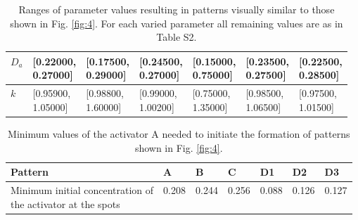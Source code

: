 \begin{table}[hb]
\begin{tabular}{|l|l|l|l|l|l|l|}
$D_{a}$				& \thead{{[}0.22000, \\ 0.27000{]}} & \thead{{[}0.17500, \\ 0.29000{]}} & \thead{{[}0.24500, \\ 0.27000{]}} & \thead{{[}0.15000, \\ 0.75000{]}} & \thead{{[}0.23500, \\ 0.27500{]}} & \thead{{[}0.22500, \\ 0.28500{]}} \\ \hline
$k$					& \thead{{[}0.95900, \\ 1.05000{]}} & \thead{{[}0.98800, \\ 1.60000{]}} & \thead{{[}0.99000, \\ 1.00200{]}} & \thead{{[}0.75000, \\ 1.35000{]}} & \thead{{[}0.98500, \\ 1.06500{]}} & \thead{{[}0.97500, \\ 1.01500{]}} \\ \hline
\end{tabular}
\caption{Ranges of parameter values resulting in patterns visually similar to those shown in Fig. \ref{fig:4}. For each varied parameter all remaining values are as in Table S2.}
\label{tab:S3}
\end{table}

\begin{table}[hb]
\centering
\begin{tabular}{|l|l|l|l|l|l|l|}
\hline
\textbf{Pattern}                                            & \textbf{A} & \textbf{B} & \textbf{C} & \textbf{D1} & \textbf{D2} & \textbf{D3} \\ \hline
\thead{Minimum initial concentration of \\ the activator at the spots} & 0.208      & 0.244      & 0.256      & 0.088       & 0.126       & 0.127       \\ \hline
\end{tabular}
\caption{Minimum values of the activator A needed to initiate the formation of patterns shown in Fig. \ref{fig:4}.}
\label{tab:S4}
\end{table}

